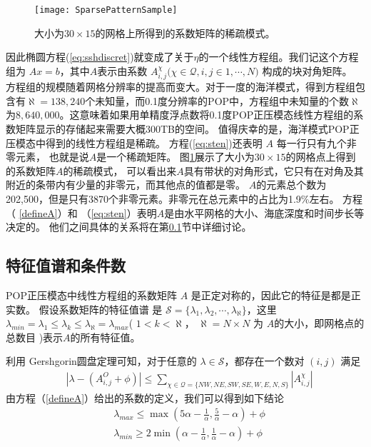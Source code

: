 \begin{figure}
\centering
\texttt{[image: SparsePatternSample]}
\caption[] {大小为$30\times 15$的网格上所得到的系数矩阵的稀疏模式。 \label{fig:spy}}
\end{figure}
因此椭圆方程(\ref{eq:sshdiscret})就变成了关于$\eta$的一个线性方程组。我们记这个方程组为 $Ax= b$，其中$A$表示由系数 $A_{i,j}^{\chi } ( \chi \in \mathcal{Q}, i,j \in {1,\cdots, N)}$ 构成的块对角矩阵。
方程组的规模随着网格分辨率的提高而变大。对于一度的海洋模式，得到方程组包含有$\aleph = 138,240$个未知量，而0.1度分辨率的POP中，方程组中未知量的个数$\aleph$ 为$8,640,000$。这意味着如果用单精度浮点数将0.1度POP正压模态线性方程组的系数矩阵显示的存储起来需要大概300TB的空间。
值得庆幸的是，海洋模式POP正压模态中得到的线性方程组是稀疏。
方程(\ref{eq:sten})还表明 $A$ 每一行只有九个非零元素， 也就是说$A$是一个稀疏矩阵。 图\ref{fig:spy}展示了大小为$30\times 15$的网格点上得到的系数矩阵$A$的稀疏模式， 可以看出来$A$具有带状的对角形式，它只有在对角及其附近的条带内有少量的非零元，而其他点的值都是零。
$A$的元素总个数为202,500，但是只有3870个非零元素。非零元在总元素中的占比为1.9\%左右。
方程（ \ref{defineA}）和 （\ref{eq:sten}）表明$A$是由水平网格的大小、海底深度和时间步长等决定的。
他们之间具体的关系将在第\ref{solver:Algorithm:condition}节中详细讨论。

\subsection{特征值谱和条件数}
\label{solver:Algorithm:condition}

POP正压模态中线性方程组的系数矩阵 $A$ 是正定对称的\cite{smith2010parallel}，因此它的特征是都是正实数\cite{stewart1976positive}。
假设系数矩阵的特征值谱\cite{golub2012matrix} 是 $\mathcal{S} = \{\lambda_1, \lambda_2, \cdots, \lambda_\aleph\}$，这里 $\lambda_{min} = \lambda_1 \le \lambda_k \le \lambda_\aleph = \lambda_{max}$( $1<k <\aleph $， $\aleph=N\times N$ 为 $A$的大小，即网格点的总数目 )表示$A$的所有特征值。

利用 Gershgorin圆盘定理\cite{bell1965gershgorin}可知，对于任意的 $\lambda \in \mathcal{S}$，都存在一个数对 $(i,j)$ 满足
\begin{align}
&|\lambda -  (A_{i,j}^O + \phi ) | \le \sum_{\chi \in \mathcal{Q} = \{NW,NE,SW,SE,W,E,N,S\}}|A_{i,j}^\chi|
\end{align}
由方程（\ref{defineA}）给出的系数的定义，我们可以得到如下结论 
\begin{align} \label{eigsGersh}
&\lambda_{max} \le  \max (  5\alpha - \frac{1}{\alpha}, \frac{5}{\alpha}- \alpha) +\phi   \\
&\lambda_{min} \ge 2\min (  \alpha - \frac{1}{\alpha},\frac{1} {\alpha} -  \alpha) + \phi
\end{align}

